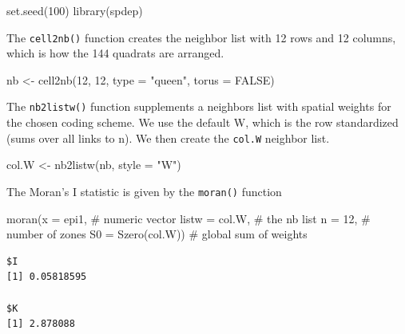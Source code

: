 \documentclass[
  letterpaper,
]{book}
\newenvironment{Shaded}{\begin{snugshade}}{\end{snugshade}}
\newcommand{\AttributeTok}[1]{\textcolor[rgb]{0.40,0.45,0.13}{#1}}
\newcommand{\CommentTok}[1]{\textcolor[rgb]{0.37,0.37,0.37}{#1}}
\newcommand{\ConstantTok}[1]{\textcolor[rgb]{0.56,0.35,0.01}{#1}}
\newcommand{\DecValTok}[1]{\textcolor[rgb]{0.68,0.00,0.00}{#1}}
\newcommand{\FunctionTok}[1]{\textcolor[rgb]{0.28,0.35,0.67}{#1}}
\newcommand{\NormalTok}[1]{\textcolor[rgb]{0.00,0.23,0.31}{#1}}
\newcommand{\OtherTok}[1]{\textcolor[rgb]{0.00,0.23,0.31}{#1}}
\newcommand{\StringTok}[1]{\textcolor[rgb]{0.13,0.47,0.30}{#1}}
\begin{document}
\begin{Shaded}
\begin{Highlighting}[]
\FunctionTok{set.seed}\NormalTok{(}\DecValTok{100}\NormalTok{)}
\FunctionTok{library}\NormalTok{(spdep)}
\end{Highlighting}
\end{Shaded}

The \texttt{cell2nb()} function creates the neighbor list with 12 rows
and 12 columns, which is how the 144 quadrats are arranged.

\begin{Shaded}
\begin{Highlighting}[]
\NormalTok{nb }\OtherTok{\textless{}{-}} \FunctionTok{cell2nb}\NormalTok{(}\DecValTok{12}\NormalTok{, }\DecValTok{12}\NormalTok{, }\AttributeTok{type =} \StringTok{"queen"}\NormalTok{, }\AttributeTok{torus =} \ConstantTok{FALSE}\NormalTok{)}
\end{Highlighting}
\end{Shaded}

The \texttt{nb2listw()} function supplements a neighbors list with
spatial weights for the chosen coding scheme. We use the default W,
which is the row standardized (sums over all links to n). We then create
the \texttt{col.W} neighbor list.

\begin{Shaded}
\begin{Highlighting}[]
\NormalTok{col.W }\OtherTok{\textless{}{-}} \FunctionTok{nb2listw}\NormalTok{(nb, }\AttributeTok{style =} \StringTok{"W"}\NormalTok{)}
\end{Highlighting}
\end{Shaded}

The Moran's I statistic is given by the \texttt{moran()} function

\begin{Shaded}
\begin{Highlighting}[]
\FunctionTok{moran}\NormalTok{(}\AttributeTok{x =}\NormalTok{ epi1, }\CommentTok{\# numeric vector}
      \AttributeTok{listw =}\NormalTok{ col.W, }\CommentTok{\# the nb list}
      \AttributeTok{n =} \DecValTok{12}\NormalTok{, }\CommentTok{\# number of zones}
      \AttributeTok{S0 =} \FunctionTok{Szero}\NormalTok{(col.W)) }\CommentTok{\# global sum of weights}
\end{Highlighting}
\end{Shaded}

\begin{verbatim}
$I
[1] 0.05818595

$K
[1] 2.878088
\end{verbatim}
\end{document}
